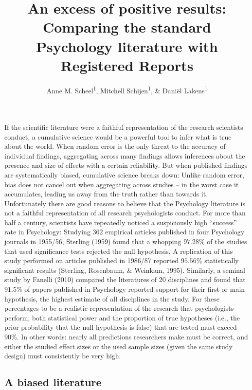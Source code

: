\documentclass[british,,jou,floatsintext]{apa6}
\author{Anne M. Scheel\textsuperscript{1}, Mitchell Schijen\textsuperscript{1}, \& Daniël Lakens\textsuperscript{1}}
\affiliation{
\vspace{0.5cm}
\textsuperscript{1} Eindhoven University of Technology}
\title{An excess of positive results: Comparing the standard Psychology literature with Registered Reports}
\date{}
\begin{document}
\maketitle

If the scientific literature were a faithful representation of the research scientists conduct, a cumulative science would be a powerful tool to infer what is true about the world.
When random error is the only threat to the accuracy of individual findings, aggregating across many findings allows inferences about the presence and size of effects with a certain reliability.
But when published findings are systematically biased, cumulative science breaks down:
Unlike random error, bias does not cancel out when aggregating across studies -- in the worst case it accumulates, leading us away from the truth rather than towards it.
Unfortunately there are good reasons to believe that the Psychology literature is not a faithful representation of all research psychologists conduct.
For more than half a century, scientists have repeatedly noticed a suspiciously high \enquote{success} rate in Psychology:
Studying 362 empirical articles published in four Psychology journals in 1955/56, Sterling (1959) found that a whopping \(97.28\%\) of the studies that used significance tests rejected the null hypothesis.
A replication of this study performed on articles published in 1986/87 reported \(95.56\%\) statistically significant results (Sterling, Rosenbaum, \& Weinkam, 1995).
Similarly, a seminal study by Fanelli (2010) compared the literatures of 20 disciplines and found that \(91.5\%\) of papers published in Psychology reported support for their first or main hypothesis, the highest estimate of all disciplines in the study.
For these percentages to be a realistic representation of the research that psychologists perform, both statistical power and the proportion of true hypotheses (i.e., the prior probability that the null hypothesis is false) that are tested must exceed \(90\%\).
In other words: nearly all predictions researchers make must be correct, and either the studied effect sizes or the used sample sizes (given the same study design) must consistently be very high.

\hypertarget{a-biased-literature}{%
\subsection{A biased literature}\label{a-biased-literature}}
\end{document}
